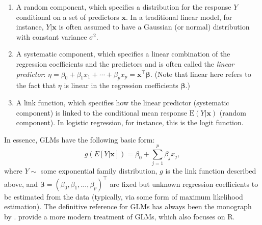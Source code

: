 \begin{enumerate}
\def\labelenumi{\arabic{enumi}.}
\item
  A random component, which specifies a distribution for the response
  \(Y\) conditional on a set of predictors \(\boldsymbol{x}\). In a
  traditional linear model, for instance, \(Y|\boldsymbol{x}\) is often
  assumed to have a Gaussian (or normal) distribution with constant
  variance \(\sigma^2\).
\item
  A systematic component, which specifies a linear combination of the
  regression coefficients and the predictors and is often called the
  \emph{linear predictor}:
  \(\eta = \beta_0 + \beta_1x_1 + \cdots + \beta_px_p = \boldsymbol{x}^\top\boldsymbol{\beta}\).
  (Note that linear here refers to the fact that \(\eta\) is linear in
  the regression coefficients \(\boldsymbol{\beta}\).)
\item
  A link function, which specifies how the linear predictor (systematic
  component) is linked to the conditional mean response
  \(\mathrm{E}\left(Y|\boldsymbol{x}\right)\) (random component). In
  logistic regression, for instance, this is the logit function.
\end{enumerate}

In essence, GLMs have the following basic form: \begin{equation}
  g\left(E\left[Y|\boldsymbol{x}\right]\right) = \beta_0 + \sum_{j=1}^p \beta_jx_j,
  \label{eqn:glm}
\end{equation} where \(Y \sim\) some exponential family distribution,
\(g\) is the link function described above, and
\(\boldsymbol{\beta} = \left(\beta_0, \beta_1, \dots, \beta_p\right)^\top\)
are fixed but unknown regression coefficients to be estimated from the
data (typically, via some form of maximum likelihood estimation). The
definitive reference for GLMs has always been the monograph by
\citet{mccullagh-1989-glm}. \citet{dunn-2018-glm} provide a more modern
treatment of GLMs, which also focuses on R.

